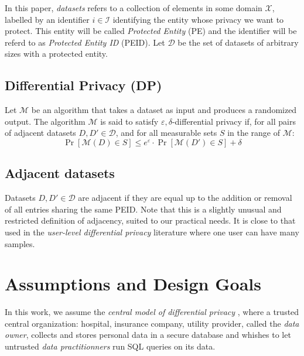 \documentclass[letterpaper]{article} %
\begin{document}
In this paper, \emph{datasets} refers to a collection of elements in some domain $\mathcal{X}$, labelled by an identifier $i\in \mathcal{I}$ identifying the entity whose privacy we want to protect. This entity will be called \emph{Protected Entity} (PE) and the identifier will be referd to as \emph{Protected Entity ID} (PEID). Let $\mathcal{D}$ be the set of datasets of arbitrary sizes with a protected entity.

\subsection*{Differential Privacy (DP)}

Let $\mathcal{M}$ be an algorithm that takes a dataset as input and produces a randomized output. The algorithm $\mathcal{M}$ is said to satisfy $\varepsilon,\delta$-differential privacy if, for all pairs of adjacent datasets $D, D' \in \mathcal{D}$, and for all measurable sets $S$ in the range of $\mathcal{M}$:
$$\Pr[\mathcal{M}(D) \in S] \leq e^{\varepsilon} \cdot \Pr[\mathcal{M}(D') \in S] + \delta$$

\subsection*{Adjacent datasets}

Datasets $D, D' \in \mathcal{D}$ are adjacent if they are equal up to the addition or removal of all entries sharing the same PEID. Note that this is a slightly unusual and restricted definition of adjacency, suited to our practical needs. It is close to that used in the \emph{user-level differential privacy} literature \cite{liu2020learning, wilson2019differentially} where one user can have many samples.

\section{Assumptions and Design Goals}

In this work, we assume the \emph{central model of differential privacy} \cite{near2020threat}, where a trusted central organization: hospital, insurance company, utility provider, called the \emph{data owner}, collects and stores personal data in a secure database and whishes to let untrusted \emph{data practitionners} run SQL queries on its data.
\end{document}
